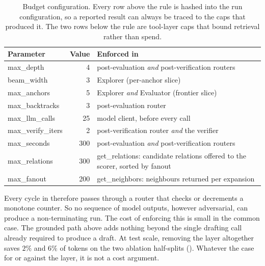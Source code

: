 \begin{table}[!tb]
  \begin{center}
    \caption{Budget configuration. Every row above the rule is hashed
      into the run configuration, so a reported result can always be
      traced to the caps that produced it. The two rows below the rule
      are tool-layer caps that bound retrieval rather than spend.}
    \label{tab:budget}
    \footnotesize
    \begin{tabular}{|l|r|L{55mm}|}
      \hline
      \textbf{Parameter} & \textbf{Value} & \textbf{Enforced in} \\
      \hline
      \textsf{max\_depth} & 4 & post-evaluation \emph{and}
      post-verification routers \\
      \textsf{beam\_width} & 3 & Explorer (per-anchor slice) \\
      \textsf{max\_anchors} & 5 & Explorer \emph{and} Evaluator
      (frontier slice) \\
      \textsf{max\_backtracks} & 3 & post-evaluation router \\
      \textsf{max\_llm\_calls} & 25 & model client, before every call \\
      \textsf{max\_verify\_iters} & 2 & post-verification router
      \emph{and} the verifier \\
      \textsf{max\_seconds} & 300 & post-evaluation \emph{and}
      post-verification routers \\
      \hline
      \textsf{max\_relations} & 300 & \textsf{get\_relations}: candidate
      relations offered to the scorer, sorted by fanout \\
      \textsf{max\_fanout} & 200 & \textsf{get\_neighbors}: neighbours
      returned per expansion \\
      \hline
    \end{tabular}
  \end{center}
\end{table}

Every cycle in  therefore passes through a router
that checks or decrements a monotone counter. So no sequence of model
outputs, however adversarial, can produce a non-terminating run. The
cost of enforcing this is small in the common case. The grounded path
above adds nothing beyond the single drafting call already required to
produce a draft. At test scale, removing the layer altogether saves
$2\%$ and $6\%$ of tokens on the two ablation half-splits
(). Whatever the case for or against the layer, it is
not a cost argument.

